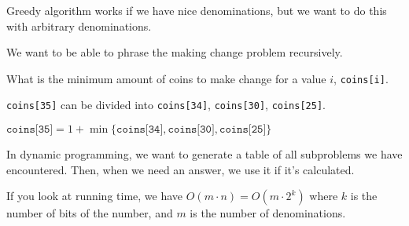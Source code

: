 \documentclass[12pt]{article}
\begin{document}
Greedy algorithm works if we have nice denominations, but we want to do this
with arbitrary denominations.

We want to be able to phrase the making change problem recursively.

What is the minimum amount of coins to make change for a value $i$,
\texttt{coins[i]}.

\texttt{coins[35]} can be divided into \texttt{coins[34]}, \texttt{coins[30]},
\texttt{coins[25]}.

$\texttt{coins[35]} = 1 + \min\{\texttt{coins[34]}, \texttt{coins[30]},
\texttt{coins[25]}\}$

In dynamic programming, we want to generate a table of all subproblems we have
encountered. Then, when we need an answer, we use it if it's calculated.

If you look at running time, we have $O(m \cdot n) = O(m \cdot 2^k)$ where $k$
is the number of bits of the number, and $m$ is the number of denominations.
\end{document}
